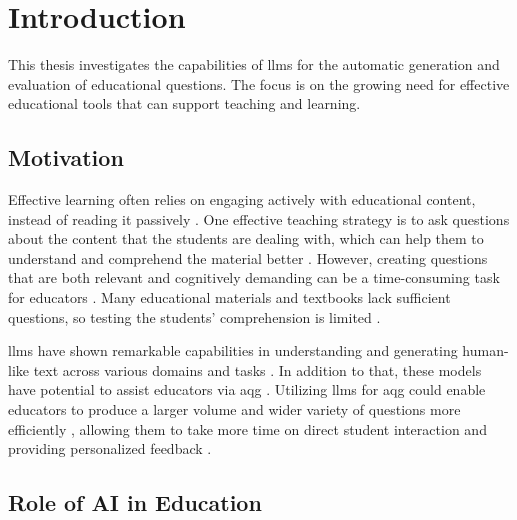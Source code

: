 \section{Introduction}

This thesis investigates the capabilities of \ac{llms} for the automatic generation and evaluation of educational questions. The focus is on the growing need for effective educational tools that can support teaching and learning.

\subsection{Motivation}

Effective learning often relies on engaging actively with educational content, instead of reading it passively \cite{steuer_i_2021}. One effective teaching strategy is to ask questions about the content that the students are dealing with, which can help them to understand and comprehend the material better \cite{steuer_i_2021}. However, creating questions that are both relevant and cognitively demanding can be a time-consuming task for educators \cite{steuer_i_2021,vu_chatgpt-based_2024}. Many educational materials and textbooks lack sufficient questions, so testing the students' comprehension is limited \cite{steuer_i_2021}.

\ac{llms} have shown remarkable capabilities in understanding and generating human-like text across various domains and tasks \cite{fan_bibliometric_2024,wang_history_2024}. In addition to that, these models have potential to assist educators via \ac{aqg} \cite{vu_chatgpt-based_2024,ling_automatic_2024}. Utilizing \ac{llms} for \ac{aqg} could enable educators to produce a larger volume and wider variety of questions more efficiently \cite{scaria_how_2024,moore_automatic_2024,hang_mcqgen_2024}, allowing them to take more time on direct student interaction \cite{doughty_comparative_2024,al_faraby_analysis_2024} and providing personalized feedback \cite{ling_automatic_2024}.

\subsection{Role of AI in Education}

